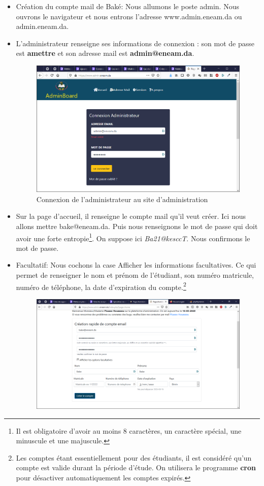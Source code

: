 \documentclass[a4paper,12pt,french]{report} %
\begin{document}
\begin{itemize}
\item Création du compte mail de Baké: Nous allumons le poste admin. Nous ouvrons le navigateur et nous entrons l'adresse www.admin.eneam.da ou admin.eneam.da.
\item L'administrateur renseigne ses informations de connexion : son mot de passe est \textbf{amettre} et son adresse mail est \textbf{admin@eneam.da}.
\begin{figure}[H]
\centering
\includegraphics[scale=0.5]{figure/connexion_admin.png}
\caption{Connexion de l'administrateur au site d'administration}
\end{figure}
\item Sur la page d'accueil, il renseigne le compte mail qu'il veut créer. Ici nous allons mettre bake@eneam.da. Puis nous renseignons le mot de passe qui doit avoir une forte entropie\footnote{Il est obligatoire d'avoir au moins 8 caractères, un caractère spécial, une minuscule et une majuscule.}. On suppose ici \emph{Ba21@kesccT}. Nous confirmons le mot de passe.
\item Facultatif: Nous cochons la case Afficher les informations facultatives. Ce qui permet de renseigner le nom et prénom de l'étudiant, son numéro matricule, numéro de téléphone, la date d'expiration du compte.\footnote{Les comptes étant essentiellement pour des étudiants, il est  considéré qu'un compte est valide durant la période d'étude. On utilisera le programme \textbf{cron} pour désactiver automatiquement les comptes expirés.}
\begin{figure}[H]
\centering
\includegraphics[width=483pt]{figure/creation_compte_bake.png} \\[1cm]

\end{figure}
\end{itemize}
\end{document}
